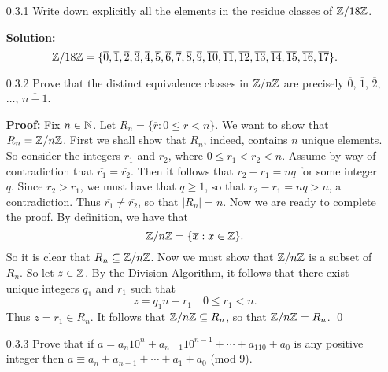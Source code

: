 \begin{enumerate}
   \item[0.3.1]   Write down explicitly all the elements in the residue classes
                  of $\mathbb{Z}/18\mathbb{Z}$.
   
      \textbf{Solution:}
      $$\mathbb{Z}/18\mathbb{Z} = \{\overline{0},  \overline{1},  \overline{2},  \overline{3},
                    \overline{4},  \overline{5},  \overline{6},  \overline{7},
                    \overline{8},  \overline{9},  \overline{10}, \overline{11},
                    \overline{12}, \overline{13}, \overline{14}, \overline{15},
                    \overline{16}, \overline{17}\}.$$
   \item[0.3.2]   Prove that the distinct equivalence classes in $\mathbb{Z}/n\mathbb{Z}$ are
                  precisely $\overline{0}$, $\overline{1}$, $\overline{2}$,
                  $\ldots$, $\overline{n - 1}$.
                  
      \textbf{Proof:} Fix $n \in \mathbb{N}$. Let
      $R_n = \{\overline{r} : 0 \le r < n\}$. We want to show that
      $R_n = \mathbb{Z}/n\mathbb{Z}$. First we shall show that $R_n$, indeed, contains $n$
      unique elements. So consider the integers $r_1$ and $r_2$, where
      $0 \le r_1 < r_2 < n$. Assume by way of contradiction that
      $\overline{r_1} = \overline{r_2}$. Then it follows that
      $r_2 - r_1 = nq$ for some integer $q$. Since $r_2 > r_1$, we must have
      that $q \ge 1$, so that $r_2  - r_1 = nq > n$, a contradiction. Thus
      $\overline{r_1} \neq \overline{r_2}$, so that $|R_n| = n$. Now we are
      ready to complete the proof. By definition, we have that
      $$\mathbb{Z}/n\mathbb{Z} = \{\overline{x} : x \in \mathbb{Z}\}.$$
      So it is clear that $R_n \subseteq \mathbb{Z}/n\mathbb{Z}$. Now we must show that $\mathbb{Z}/n\mathbb{Z}$
      is a subset of $R_n$. So let $z \in \mathbb{Z}$. By the Division Algorithm, it
      follows that there exist unique integers $q_1$ and $r_1$ such that
      $$z = q_1n + r_1 \quad 0 \le r_1 < n.$$
      Thus $\overline{z} = \overline{r_1} \in R_n$. It follows that
      $\mathbb{Z}/n\mathbb{Z} \subseteq R_n$, so that $\mathbb{Z}/n\mathbb{Z} = R_n$. \qed
   \item[0.3.3]   Prove that if
                  $a = a_n10^n + a_{n - 1}10^{n - 1} + \cdots + a_110 + a_0$ is
                  any positive integer then $a \equiv a_n + a_{n - 1} + \cdots +
                  a_1 + a_0$ (mod 9).
                  

\end{enumerate}
